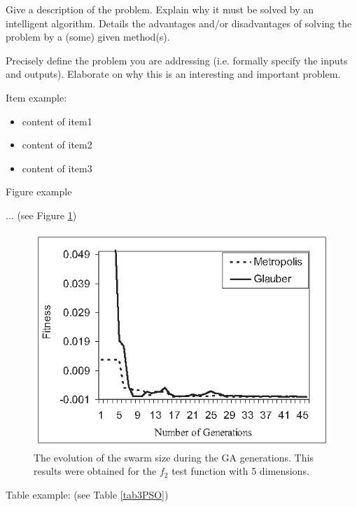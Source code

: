 \documentclass[runningheads,a4paper,11pt]{report}
\begin{document}
Give a description of the problem.
Explain why it must be solved by an intelligent algorithm. 
Details the advantages and/or disadvantages of solving the problem by a (some) given method(s).

Precisely define the problem you are addressing (i.e. formally specify the inputs and outputs). Elaborate on why this is an interesting and important problem.


Item example: 

\begin{itemize}
	\item content of item1
 	\item content of item2
 	\item content of item3
\end{itemize}



Figure example 

$\ldots$ (see Figure \ref{swarmsize})

\begin{figure}[htbp]
	\centerline{\includegraphics{Fig/FitEvol.eps}}  
	\caption{The evolution of the swarm size during the GA generations. This results were obtained for the $f_2$ test function with 5 dimensions.}
	\label{swarmsize}
\end{figure}


Table example: (see Table \ref{tab3PSO})
\end{document}
